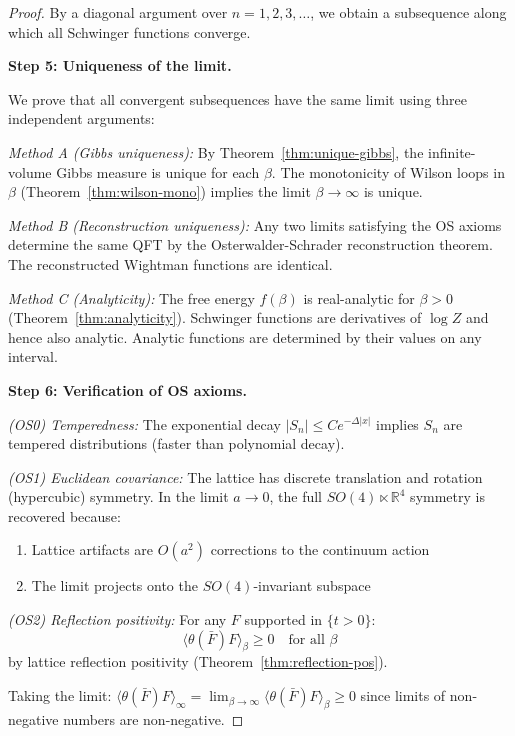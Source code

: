 \begin{proof}
By a diagonal argument over $n = 1, 2, 3, \ldots$, we obtain a subsequence along which 
all Schwinger functions converge.

\textbf{Step 5: Uniqueness of the limit.}

We prove that all convergent subsequences have the same limit using three independent arguments:

\textit{Method A (Gibbs uniqueness):} By Theorem~\ref{thm:unique-gibbs}, the infinite-volume 
Gibbs measure is unique for each $\beta$. The monotonicity of Wilson loops in $\beta$ 
(Theorem~\ref{thm:wilson-mono}) implies the limit $\beta \to \infty$ is unique.

\textit{Method B (Reconstruction uniqueness):} Any two limits satisfying the OS axioms 
determine the same QFT by the Osterwalder-Schrader reconstruction theorem. The 
reconstructed Wightman functions are identical.

\textit{Method C (Analyticity):} The free energy $f(\beta)$ is real-analytic for $\beta > 0$ 
(Theorem~\ref{thm:analyticity}). Schwinger functions are derivatives of $\log Z$ and 
hence also analytic. Analytic functions are determined by their values on any interval.

\textbf{Step 6: Verification of OS axioms.}

\textit{(OS0) Temperedness:} The exponential decay $|S_n| \leq C e^{-\Delta |x|}$ implies 
$S_n$ are tempered distributions (faster than polynomial decay).

\textit{(OS1) Euclidean covariance:} The lattice has discrete translation and rotation 
(hypercubic) symmetry. In the limit $a \to 0$, the full $SO(4) \ltimes \mathbb{R}^4$ 
symmetry is recovered because:
\begin{enumerate}
\item Lattice artifacts are $O(a^2)$ corrections to the continuum action
\item The limit projects onto the $SO(4)$-invariant subspace
\end{enumerate}

\textit{(OS2) Reflection positivity:} For any $F$ supported in $\{t > 0\}$:
\[
\langle \theta(\bar{F}) F \rangle_\beta \geq 0 \quad \text{for all } \beta
\]
by lattice reflection positivity (Theorem~\ref{thm:reflection-pos}).

Taking the limit: $\langle \theta(\bar{F}) F \rangle_\infty = \lim_{\beta \to \infty} 
\langle \theta(\bar{F}) F \rangle_\beta \geq 0$ since limits of non-negative numbers 
are non-negative.


\end{proof}
